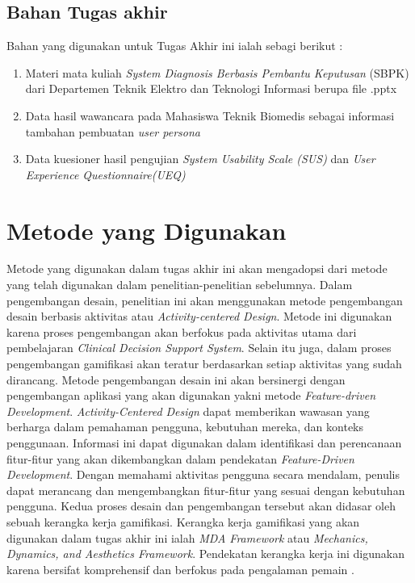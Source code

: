 \subsection{Bahan Tugas akhir}
Bahan yang digunakan untuk Tugas Akhir ini ialah sebagi berikut :
\begin{enumerate}
	\item Materi mata kuliah \textit{System Diagnosis Berbasis Pembantu Keputusan} (SBPK) dari Departemen Teknik Elektro dan Teknologi Informasi berupa file .pptx
	\item Data hasil wawancara pada Mahasiswa Teknik Biomedis sebagai informasi tambahan pembuatan \textit{user persona}
	\item Data kuesioner hasil pengujian \textit{System Usability Scale (SUS)} dan \textit{User Experience Questionnaire(UEQ)}
\end{enumerate}

\section{Metode yang Digunakan}
Metode yang digunakan dalam tugas akhir ini akan mengadopsi dari metode yang telah digunakan dalam penelitian-penelitian sebelumnya.
Dalam pengembangan desain, penelitian ini akan menggunakan metode pengembangan desain berbasis aktivitas atau \textit{Activity-centered Design}.
Metode ini digunakan karena proses pengembangan akan berfokus pada aktivitas utama dari pembelajaran \textit{Clinical Decision Support System}.
Selain itu juga, dalam proses pengembangan gamifikasi akan teratur berdasarkan setiap aktivitas yang sudah dirancang.
Metode pengembangan desain ini akan bersinergi dengan pengembangan aplikasi yang akan digunakan yakni metode \textit{Feature-driven Development}.
\textit{Activity-Centered Design} dapat memberikan wawasan yang berharga dalam pemahaman pengguna, kebutuhan mereka, dan konteks penggunaan. 
Informasi ini dapat digunakan dalam identifikasi dan perencanaan fitur-fitur yang akan dikembangkan dalam pendekatan \textit{Feature-Driven Development}. 
Dengan memahami aktivitas pengguna secara mendalam, penulis dapat merancang dan mengembangkan fitur-fitur yang sesuai dengan kebutuhan pengguna.
Kedua proses desain dan pengembangan tersebut akan didasar oleh sebuah kerangka kerja gamifikasi. 
Kerangka kerja gamifikasi yang akan digunakan dalam tugas akhir ini ialah \textit{MDA Framework} atau \textit{Mechanics, Dynamics, and Aesthetics Framework}.
Pendekatan kerangka kerja ini digunakan karena bersifat komprehensif dan berfokus pada pengalaman pemain \cite{marisa2020gamifikasi}.

